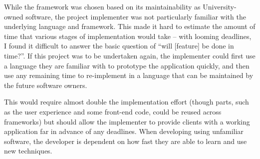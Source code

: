While the framework was chosen based on its maintainability as
University-owned software, the project implementer was not particularly
familiar with the underlying language and framework. This made it hard to
estimate the amount of time that various stages of implementation would take
-- with looming deadlines, I found it difficult to answer the basic question
of ``will [feature] be done in time?''. If this project was to be undertaken
again, the implementer could first use a language they are familiar with to
prototype the application quickly, and then use any remaining time to
re-implement in a language that can be maintained by the future software
owners.

This would require almost double the implementation effort (though parts, such
as the user experience and some front-end code, could be reused across
frameworks) but should allow the implementer to provide clients with a working
application far in advance of any deadlines. When developing using unfamiliar
software, the developer is dependent on how fast they are able to learn and
use new techniques.
